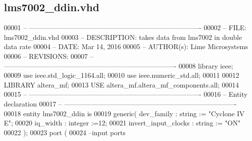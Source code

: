 \subsection{lms7002\+\_\+ddin.\+vhd}
\label{rx__path__top_2diq2fifo_2synth_2lms7002__ddin_8vhd_source}

\begin{DoxyCode}
00001 \textcolor{keyword}{-- ---------------------------------------------------------------------------- }
00002 \textcolor{keyword}{-- FILE:    lms7002\_ddin.vhd}
00003 \textcolor{keyword}{-- DESCRIPTION: takes data from lms7002 in double data rate}
00004 \textcolor{keyword}{-- DATE:    Mar 14, 2016}
00005 \textcolor{keyword}{-- AUTHOR(s):   Lime Microsystems}
00006 \textcolor{keyword}{-- REVISIONS:}
00007 \textcolor{keyword}{-- ---------------------------------------------------------------------------- }
00008 \textcolor{vhdlkeyword}{library }\textcolor{keywordflow}{ieee};
00009 \textcolor{vhdlkeyword}{use }ieee.std\_logic\_1164.\textcolor{keywordflow}{all};
00010 \textcolor{vhdlkeyword}{use }ieee.numeric\_std.\textcolor{keywordflow}{all};
00011 
00012 \textcolor{vhdlkeyword}{LIBRARY }\textcolor{keywordflow}{altera\_mf};
00013 \textcolor{vhdlkeyword}{USE }altera_mf.altera\_mf\_components.\textcolor{keywordflow}{all};
00014 
00015 \textcolor{keyword}{-- ----------------------------------------------------------------------------}
00016 \textcolor{keyword}{-- Entity declaration}
00017 \textcolor{keyword}{-- ----------------------------------------------------------------------------}
00018 \textcolor{keywordflow}{entity }lms7002_ddin \textcolor{keywordflow}{is}
00019     \textcolor{keywordflow}{generic}\textcolor{vhdlchar}{(} \textcolor{vhdlchar}{dev_family}             \textcolor{vhdlchar}{:} \textcolor{comment}{string} \textcolor{vhdlchar}{:=} \textcolor{keyword}{"Cyclone IV E"};
00020                 \textcolor{vhdlchar}{iq_width}                    \textcolor{vhdlchar}{:} \textcolor{comment}{integer} \textcolor{vhdlchar}{:=}\textcolor{vhdllogic}{}\textcolor{vhdllogic}{12};
00021                 \textcolor{vhdlchar}{invert_input_clocks} \textcolor{vhdlchar}{:} \textcolor{comment}{string} \textcolor{vhdlchar}{:=} \textcolor{keyword}{"ON"}
00022     \textcolor{vhdlchar}{)};
00023     \textcolor{keywordflow}{port} \textcolor{vhdlchar}{(}
00024 \textcolor{keyword}{      --input ports }

\end{DoxyCode}
